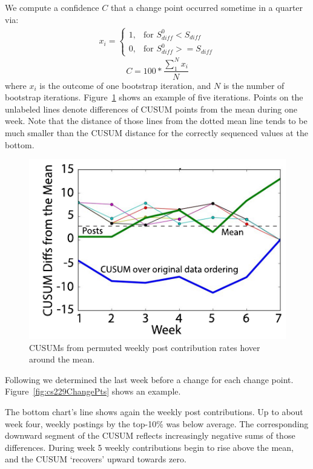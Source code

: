 We compute a confidence $C$ that a change point occurred sometime in a
quarter via:
\begin{equation}
  \begin{split}
    x_i = \left.
    \begin{cases}
      1, & \mbox{for } S_{diff}^0 < S_{diff} \\
      0, & \mbox{for }S_{diff}^0 >= S_{diff}
    \end{cases}
    \right.
  \end{split}
\end{equation}
\begin{equation}
  \label{eqn:confidence}
  C = \left.
  100*\frac{\sum_1^N x_i}{N}
  \right.
\end{equation}
where $x_i$ is the outcome of one bootstrap iteration, and $N$ is the
number of bootstrap iterations. Figure~\ref{fig:multiBoots} shows an
example of five iterations. Points on the unlabeled lines denote
differences of CUSUM points from the mean during one week. Note that
the distance of those lines from the dotted mean line tends to be
much smaller than the CUSUM distance for the correctly sequenced
values at the bottom.
\begin{figure}[]
       \centering
       \includegraphics{Figs/multiBootstrapCurvesUrbStud145Summer14.pdf}
       \caption{\textnormal{CUSUMs from permuted weekly post
           contribution rates hover around the mean.}}
       \label{fig:multiBoots}
\end{figure}
Following \cite{tayl16} we determined the last week before a change
for each change point. Figure~\ref{fig:cs229ChangePts} shows an
example.

The bottom chart's line shows again the weekly post contributions.
Up to about week four, weekly postings by the top-10\% was below
average. The corresponding downward segment of the CUSUM reflects
increasingly negative sums of those differences. During week 5 weekly
contributions begin to rise above the mean, and the CUSUM `recovers'
upward towards zero.

